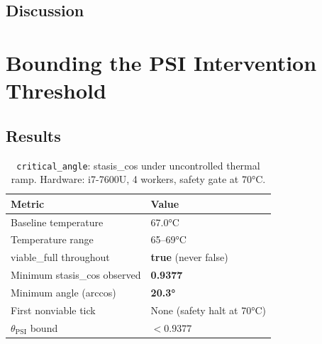 \documentclass[11pt, a4paper]{article}
\newcommand{\thetaPSI}{\theta_{\mathrm{PSI}}}
\begin{document}
\subsection{Discussion}

%
%
%

\section{Bounding the PSI Intervention Threshold}
\label{sec:psi}

%
%
%

\subsection{Results}

\begin{table}[h]
\centering
\caption{\texttt{critical\_angle}: stasis\_cos under uncontrolled thermal ramp.
         Hardware: i7-7600U, 4 workers, safety gate at 70°C.}
\label{tab:critical}
\begin{tabular}{ll}
\toprule
\textbf{Metric}              & \textbf{Value} \\
\midrule
Baseline temperature         & 67.0°C \\
Temperature range            & 65--69°C \\
viable\_full throughout      & \textbf{true} (never false) \\
Minimum stasis\_cos observed & \textbf{0.9377} \\
Minimum angle (arccos)       & \textbf{20.3°} \\
First nonviable tick         & None (safety halt at 70°C) \\
$\thetaPSI$ bound            & $< 0.9377$ \\
\bottomrule
\end{tabular}
\end{table}
\end{document}
